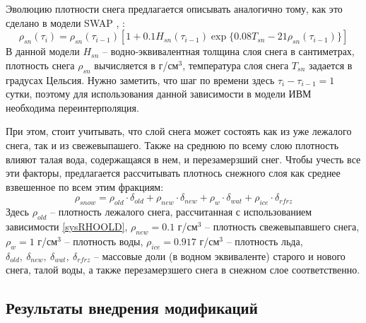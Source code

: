 \documentclass[a4paper, fontsize=14pt]{scrartcl}
\begin{document}
Эволюцию плотности снега предлагается описывать аналогично тому, как это сделано в модели SWAP \cite{Gusev2002}, \cite{YOSIDA1955}:
\begin{equation}
    \rho_{sn}(\tau_i) = \rho_{sn}(\tau_{i-1}) \left[  1 + 0.1 H_{sn}(\tau_{i-1}) \exp \{ 0.08 T_{sn} - 21 \rho_{sn}(\tau_{i-1})  \} \right]    \label{sysRHOOLD}  
\end{equation}
В данной модели $H_{sn}$ -- водно-эквивалентная толщина слоя снега в сантиметрах, плотность снега $\rho_{sn}$ вычисляется в г/см$^3$, температура слоя снега $T_{sn}$ задается в градусах Цельсия. Нужно заметить, что шаг по времени здесь $\tau_{i} - \tau_{i-1} = 1$ сутки, поэтому для использования данной зависимости в модели ИВМ необходима переинтерполяция.

При этом, стоит учитывать, что слой снега может состоять как из уже лежалого снега, так и из свежевыпашего. Также на среднюю по всему слою плотность влияют талая вода, содержащаяся в нем, и перезамерзший снег. Чтобы учесть все эти факторы, предлагается рассчитывать плотнось снежного слоя как среднее взвешенное по всем этим фракциям:
\begin{equation}
    \rho_{snow} = \rho_{old} \cdot \delta_{old} + \rho_{new} \cdot \delta_{new} + \rho_{w} \cdot \delta_{wat} + \rho_{ice} \cdot \delta_{rfrz}
\end{equation}
Здесь $\rho_{old}$ -- плотность лежалого снега, рассчитанная с использованием зависимости \eqref{sysRHOOLD},  $\rho_{new} = 0.1$ г/см$^3$ -- плотность свежевыпавшего снега, $\rho_{w} = 1$ г/см$^3$ -- плотность воды, $\rho_{ice} = 0.917$ г/см$^3$ -- плотность льда, $\delta_{old}, ~\delta_{new}, ~\delta_{wat}, ~\delta_{rfrz}$ -- массовые доли (в водном эквиваленте) старого и нового снега, талой воды, а также перезамерзшего снега в снежном слое соответственно.


\subsection{Результаты внедрения модификаций}
\end{document}
